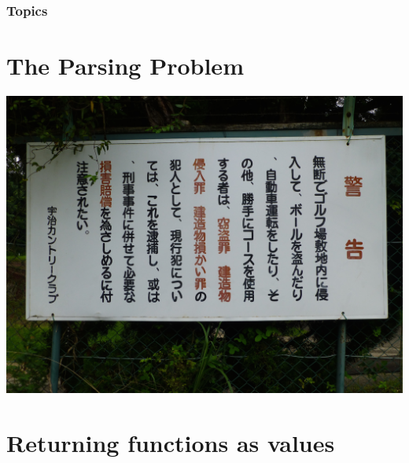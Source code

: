 \documentclass{beamer}
\begin{document}
\begin{frame}[fragile]
  \PresentationTitleSlide
\end{frame}



\begin{frame}[fragile]
  \frametitle{Topics}
  \tableofcontents
\end{frame}
\section{The Parsing Problem}
\begin{frame}[fragile]
\begin{center}
\includegraphics[scale=0.35]
    {figures/jpg/pic05.jpg}
\end{center}
\end{frame}


\section{Returning functions as values}
\end{document}
